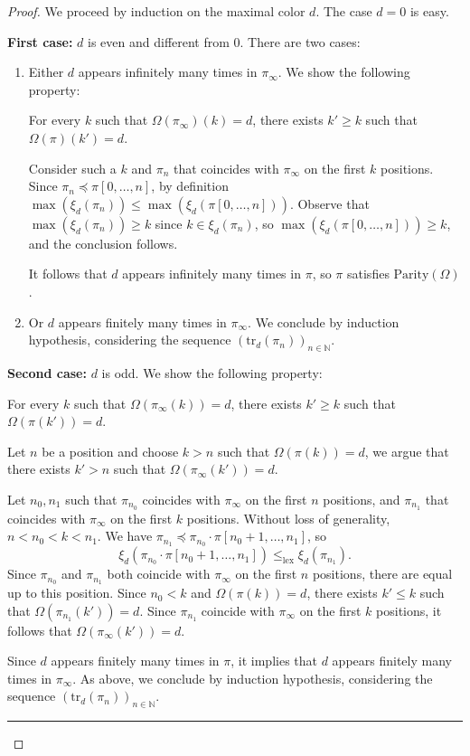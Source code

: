 \documentclass[11pt]{llncs}
\newcommand{\N}{\mathbb{N}}
\newcommand{\Parity}{\mathrm{Parity}}
\newcommand{\nN}{_{n \in \N}}
\newcommand{\lex}{\le_{\mathrm{lex}}}
\newcommand{\tr}{\mathrm{tr}}
\def\qed{\rule{0.4em}{1.4ex}}
\begin{document}
\begin{proof}
We proceed by induction on the maximal color $d$.
The case $d = 0$ is easy.

\textbf{First case:} $d$ is even and different from $0$.
There are two cases: 
\begin{enumerate}
	\item Either $d$ appears infinitely many times in $\pi_\infty$.
We show the following property: 
\begin{framed}
\noindent For every $k$ such that $\Omega(\pi_\infty)(k) = d$,
there exists $k' \ge k$ such that $\Omega(\pi)(k') = d$.
\end{framed}

Consider such a $k$ and $\pi_n$ that coincides with $\pi_\infty$ on the first $k$ positions.
Since $\pi_n \preceq \pi[0,\ldots,n]$, by definition
$\max(\xi_d(\pi_n)) \le \max(\xi_d(\pi[0,\ldots,n]))$.
Observe that $\max(\xi_d(\pi_n)) \ge k$ since $k \in \xi_d(\pi_n)$,
so $\max(\xi_d(\pi[0,\ldots,n])) \ge k$, and the conclusion follows.

It follows that $d$ appears infinitely many times in $\pi$,
so $\pi$ satisfies $\Parity(\Omega)$.

	\item Or $d$ appears finitely many times in $\pi_\infty$.
We conclude by induction hypothesis, considering the sequence $(\tr_d(\pi_n))\nN$.
\end{enumerate}

\textbf{Second case:} $d$ is odd.
We show the following property: 
\begin{framed}
\noindent For every $k$ such that $\Omega(\pi_\infty(k)) = d$,
there exists $k' \ge k$ such that $\Omega(\pi(k')) = d$.
\end{framed}
Let $n$ be a position and choose $k > n$ such that $\Omega(\pi(k)) = d$,
we argue that there exists $k' > n$ such that $\Omega(\pi_\infty(k')) = d$.

Let $n_0,n_1$ such that $\pi_{n_0}$ coincides with $\pi_\infty$ on the first $n$ positions,
and $\pi_{n_1}$ that coincides with $\pi_\infty$ on the first $k$ positions.
Without loss of generality, $n < n_0 < k < n_1$.
We have $\pi_{n_1} \preceq \pi_{n_0} \cdot \pi[n_0+1,\ldots,n_1]$,
so 
\[
\xi_d(\pi_{n_0} \cdot \pi[n_0+1,\ldots,n_1]) \lex \xi_d(\pi_{n_1}).
\]
Since $\pi_{n_0}$ and $\pi_{n_1}$ both coincide with $\pi_\infty$ on the first $n$ positions,
there are equal up to this position.
Since $n_0 < k$ and $\Omega(\pi(k)) = d$, there exists $k'\le k$ such that $\Omega(\pi_{n_1}(k')) = d$.
Since $\pi_{n_1}$ coincide with $\pi_\infty$ on the first $k$ positions, 
it follows that $\Omega(\pi_\infty(k')) = d$.

Since $d$ appears finitely many times in $\pi$,
it implies that $d$ appears finitely many times in $\pi_\infty$.
As above, we conclude by induction hypothesis, considering the sequence $(\tr_d(\pi_n))\nN$.
\hfill\qed
\end{proof}
\end{document}

